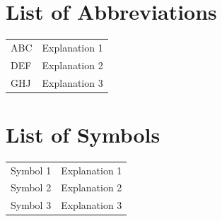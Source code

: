 

\chapter*{List of Abbreviations}\label{av}
\begin{tabular}{ll}
ABC & Explanation 1 \\
DEF & Explanation 2 \\
GHJ & Explanation 3 \\
\end{tabular}

\listoffigures

\listoftables

\chapter*{List of Symbols}\label{sv}
\begin{tabular}{ll}
Symbol 1 & Explanation 1 \\
Symbol 2 & Explanation 2 \\
Symbol 3 & Explanation 3 \\
\end{tabular}
